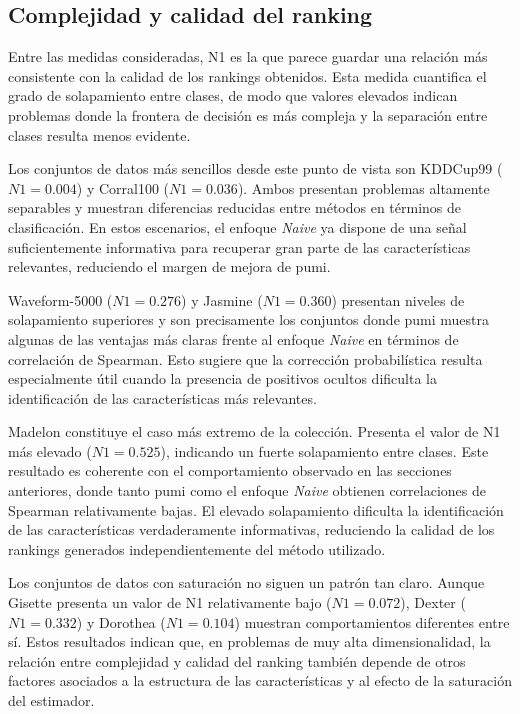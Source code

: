 \subsection{Complejidad y calidad del ranking}
\label{subsec:complejidad_spearman}

Entre las medidas consideradas, N1 es la que parece guardar una relación más consistente con la calidad de los rankings obtenidos. Esta medida cuantifica el grado de solapamiento entre clases, de modo que valores elevados indican problemas donde la frontera de decisión es más compleja y la separación entre clases resulta menos evidente.

Los conjuntos de datos más sencillos desde este punto de vista son KDDCup99 ($N1=0.004$) y Corral100 ($N1=0.036$). Ambos presentan problemas altamente separables y muestran diferencias reducidas entre métodos en términos de clasificación. En estos escenarios, el enfoque \textit{Naive} ya dispone de una señal suficientemente informativa para recuperar gran parte de las características relevantes, reduciendo el margen de mejora de \acrshort{pumi}.

Waveform-5000 ($N1=0.276$) y Jasmine ($N1=0.360$) presentan niveles de solapamiento superiores y son precisamente los conjuntos donde \acrshort{pumi} muestra algunas de las ventajas más claras frente al enfoque \textit{Naive} en términos de correlación de Spearman. Esto sugiere que la corrección probabilística resulta especialmente útil cuando la presencia de positivos ocultos dificulta la identificación de las características más relevantes.

Madelon constituye el caso más extremo de la colección. Presenta el valor de N1 más elevado ($N1=0.525$), indicando un fuerte solapamiento entre clases. Este resultado es coherente con el comportamiento observado en las secciones anteriores, donde tanto \acrshort{pumi} como el enfoque \textit{Naive} obtienen correlaciones de Spearman relativamente bajas. El elevado solapamiento dificulta la identificación de las características verdaderamente informativas, reduciendo la calidad de los rankings generados independientemente del método utilizado.

Los conjuntos de datos con saturación no siguen un patrón tan claro. Aunque Gisette presenta un valor de N1 relativamente bajo ($N1=0.072$), Dexter ($N1=0.332$) y Dorothea ($N1=0.104$) muestran comportamientos diferentes entre sí. Estos resultados indican que, en problemas de muy alta dimensionalidad, la relación entre complejidad y calidad del ranking también depende de otros factores asociados a la estructura de las características y al efecto de la saturación del estimador.

